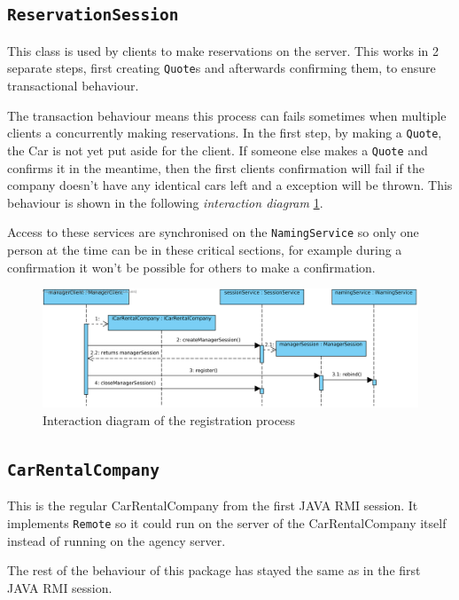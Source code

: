\documentclass[a4paper]{article}
\begin{document}
\subsection{\texttt{ReservationSession}}
This class is used by clients to make reservations on the server. This works in 2 separate steps, first creating \texttt{Quote}s and afterwards confirming them, to ensure transactional behaviour. 

The transaction behaviour means this process can fails sometimes when multiple clients a concurrently making reservations. In the first step, by making a \texttt{Quote}, the Car is not yet put aside for the client. If someone else makes a \texttt{Quote} and confirms it in the meantime, then the first clients confirmation will fail if the company doesn't have any identical cars left and a exception will be thrown. This behaviour is shown in the following  \emph{interaction diagram} \ref{fig:failed_confirmation_diagram}. 

Access to these services are synchronised on the \texttt{NamingService} so only one person at the time can be in these critical sections, for example during a confirmation it won't be possible for others to make a confirmation.
\begin{figure}[hbtp]
\centering
\includegraphics[width=\textwidth]{img/CarRentalCompany registration process.png}
\caption{Interaction diagram of the registration process}
\label{fig:failed_confirmation_diagram}
\end{figure}

\subsection{\texttt{CarRentalCompany}}
This is the regular CarRentalCompany from the first JAVA RMI session. It implements \texttt{Remote} so it could run on the server of the CarRentalCompany itself instead of running on the agency server. 

The rest of the behaviour of this package has stayed the same as in the first JAVA RMI session.
\end{document}
